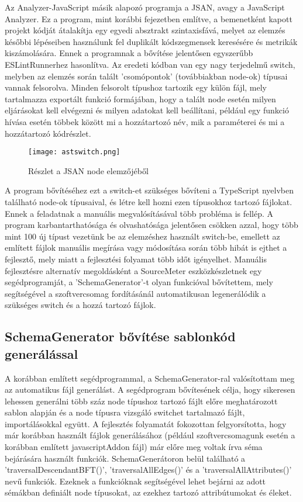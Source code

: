 Az Analyzer-JavaScript másik alapozó programja a JSAN, avagy a JavaScript Analyzer. Ez a program, mint korábbi fejezetben említve, a bemenetként kapott projekt kódját átalakítja egy egyedi absztrakt szintaxisfává, melyet az elemzés későbbi lépéseiben használunk fel duplikált kódszegmensek keresésére és metrikák kiszámolására.
Ennek a programnak a bővítése jelentősen egyszerűbb ESLintRunnerhez hasonlítva. Az eredeti kódban van egy nagy terjedelmű switch, melyben az elemzés során talált 'csomópontok' (továbbiakban node-ok) típusai vannak felsorolva. Minden felsorolt típushoz tartozik egy külön fájl, mely tartalmazza exportált funkció formájában, hogy a talált node esetén milyen eljárásokat kell elvégezni és milyen adatokat kell beállítani, például egy funkció hívása esetén többek között mi a hozzátartozó név, mik a paraméterei és mi a hozzátartozó kódrészlet. 

\begin{figure}[!htbp]
    \caption{Részlet a JSAN node elemzőjéből}\label{fig:jsanast}
    \centering
    \texttt{[image: astswitch.png]}
\end{figure}

A program bővítéséhez ezt a switch-et szükséges bővíteni a TypeScript nyelvben található node-ok típusaival, és létre kell hozni ezen típusokhoz tartozó fájlokat.
Ennek a feladatnak a manuális megvalósításával több probléma is fellép. A program karbantarthatósága és olvashatósága jelentősen csökken azzal, hogy több mint 100 új típust vezetünk be az elemzéshez használt switch-be, emellett az említett fájlok manuális megírása vagy módosítása során több hibát is ejthet a fejlesztő, mely miatt a fejlesztési folyamat több időt igényelhet. Manuális fejlesztésre alternatív megoldásként a SourceMeter eszközkészletnek egy segédprogramját, a 'SchemaGenerator'-t olyan funkcióval bővítettem, mely segítségével a szoftvercsomag fordításánál automatikusan legenerálódik a szükséges switch és a hozzá tartozó fájlok. 

\subsection{SchemaGenerator bővítése sablonkód generálással}

A korábban említett segédprogrammal, a SchemaGenerator-ral valósítottam meg az automatikus fájl generálást.
A segédprogram bővítesének célja, hogy sikeresen lehessen generálni több száz node típushoz tartozó fájlt előre meghatározott sablon alapján és a node típusra vizsgáló switchet tartalmazó fájlt, importálásokkal együtt. A fejlesztés folyamatát fokozottan felgyorsította, hogy már korábban használt fájlok generálásához (például szoftvercsomagunk esetén a korábban említett javascriptAddon fájl) már előre meg voltak írva séma bejárására használt funkciók. 
SchemaGenerátoron belül található a 'traversalDescendantBFT()', 'traversalAllEdges()' és a 'traversalAllAttributes()' nevű funkciók. Ezeknek a funkcióknak segítségével lehet bejárni az adott sémákban definiált node típusokat, az ezekhez tartozó attribútumokat és éleket.  


